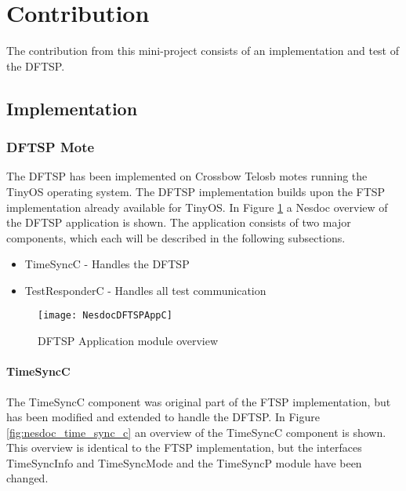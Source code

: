 \documentclass[Main]{subfiles}
\begin{document}
\section{Contribution} %
\label{sec:contribution}

	The contribution from this mini-project consists of an implementation and test of the DFTSP.
	\subsection{Implementation} %
	\label{sub:implementation}

		\subsubsection{DFTSP Mote} %
		\label{sub:dftsp_mote}
			The DFTSP has been implemented on Crossbow Telosb motes\cite{TelosBDatasheet:Online} running the TinyOS\cite{TinyOS:Online} operating system. 
			The DFTSP implementation builds upon the FTSP implementation already available for TinyOS\cite{FTSPImplementationTinyOS:Online}.
			In Figure \ref{fig:nesdoc_dstfp_app_c} a Nesdoc\cite{Nesdoc:Online} overview of the DFTSP application is shown. 
			The application consists of two major components, which each will be described in the following subsections.
			
			\begin{itemize}
			 	\item TimeSyncC - Handles the DFTSP
			 	\item TestResponderC - Handles all test communication
			\end{itemize}

			\begin{figure}[H]
				\centering
				\texttt{[image: NesdocDFTSPAppC]}
				\caption{DFTSP Application module overview}
				\label{fig:nesdoc_dstfp_app_c}
			\end{figure}

			\paragraph{TimeSyncC} %
			\label{par:timesyncc}
				The TimeSyncC component was original part of the FTSP implementation, but has been modified and extended to handle the DFTSP.
				In Figure \ref{fig:nesdoc_time_sync_c} an overview of the TimeSyncC component is shown.
				This overview is identical to the FTSP implementation, but the interfaces TimeSyncInfo and TimeSyncMode and the TimeSyncP module have been changed.
\end{document}
